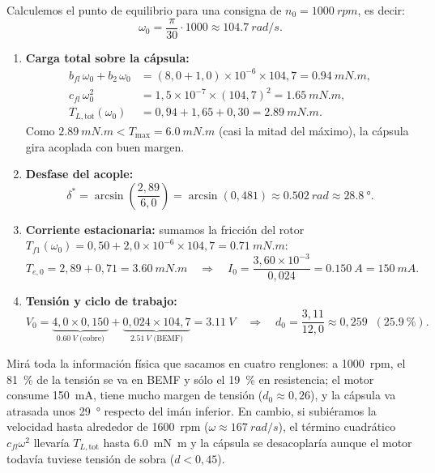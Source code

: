 \documentclass[11pt,a4paper,oneside]{book}
\begin{document}
Calculemos el punto de equilibrio para una consigna de
$n_0 = \SI{1000}{rpm}$, es decir:
\[
  \omega_0 = \frac{\pi}{30}\cdot 1000 \approx \SI{104,7}{rad/s}.
\]
\begin{enumerate}
  \item \textbf{Carga total sobre la cápsula:}
        \begin{align*}
          b_{fl}\,\omega_0 + b_2\,\omega_0 &= (8{,}0 + 1{,}0)\times 10^{-6}\times 104{,}7 = \SI{0,94}{mN.m},\\
          c_{fl}\,\omega_0^2 &= 1{,}5\times 10^{-7}\times (104{,}7)^2 = \SI{1,65}{mN.m},\\
          T_{L,\text{tot}}(\omega_0) &= 0{,}94 + 1{,}65 + 0{,}30 = \SI{2,89}{mN.m}.
        \end{align*}
        Como $\SI{2,89}{mN.m} < T_{\max} = \SI{6,0}{mN.m}$ (casi la mitad del
        máximo), la cápsula gira acoplada con buen margen.
  \item \textbf{Desfase del acople:}
        \[
          \delta^\ast = \arcsin\!\left(\frac{2{,}89}{6{,}0}\right)
                      = \arcsin(0{,}481)
                      \approx \SI{0,502}{rad} \approx \SI{28,8}{\degree}.
        \]
  \item \textbf{Corriente estacionaria:} sumamos la fricción del rotor
        $T_{f1}(\omega_0) = 0{,}50 + 2{,}0\times 10^{-6}\times 104{,}7 = \SI{0,71}{mN.m}$:
        \[
          T_{e,0} = 2{,}89 + 0{,}71 = \SI{3,60}{mN.m}
          \quad\Longrightarrow\quad
          I_0 = \frac{3{,}60\times 10^{-3}}{0{,}024} = \SI{0,150}{A} = \SI{150}{mA}.
        \]
  \item \textbf{Tensión y ciclo de trabajo:}
        \[
          V_0 = \underbrace{4{,}0\times 0{,}150}_{\SI{0,60}{V}\text{ (cobre)}}
              + \underbrace{0{,}024\times 104{,}7}_{\SI{2,51}{V}\text{ (BEMF)}}
              = \SI{3,11}{V}
          \quad\Longrightarrow\quad
          d_0 = \frac{3{,}11}{12{,}0} \approx 0{,}259 \;\; (\SI{25,9}{\percent}).
        \]
\end{enumerate}

Mirá toda la información física que sacamos en cuatro renglones: a \SI{1000}{rpm},
el \SI{81}{\percent} de la tensión se va en BEMF y sólo el \SI{19}{\percent} en
resistencia; el motor consume \SI{150}{mA}, tiene mucho margen de tensión
($d_0 \approx 0{,}26$), y la cápsula va atrasada unos \SI{29}{\degree} respecto
del imán inferior. En cambio, si subiéramos la velocidad hasta alrededor de
\SI{1600}{rpm} ($\omega \approx \SI{167}{rad/s}$), el término cuadrático
$c_{fl}\omega^2$ llevaría $T_{L,\text{tot}}$ hasta \SI{6,0}{mN.m} y la cápsula
se desacoplaría aunque el motor todavía tuviese tensión de sobra ($d < 0{,}45$).
\end{document}
